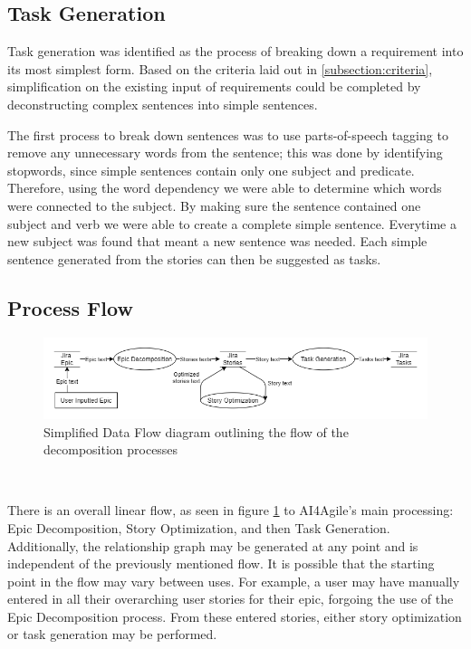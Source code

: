 \subsection{Task Generation}

Task generation was identified as the process of breaking down a requirement into its most simplest form. Based on the criteria laid out in \ref{subsection:criteria}, simplification on the existing input of requirements could be completed by deconstructing complex sentences into simple sentences. 

The first process to break down sentences was to use parts-of-speech tagging to remove any unnecessary words from the sentence; this was done by identifying stopwords, since simple sentences contain only one subject and predicate. Therefore, using the word dependency we were able to determine which words were connected to the subject. By making sure the sentence contained one subject and verb we were able to create a complete simple sentence. Everytime a new subject was found that meant a new sentence was needed. Each simple sentence generated from the stories can then be suggested as tasks.

\subsection{Process Flow}

\begin{figure}
\centerline{\includegraphics[width=\textwidth,height=\textheight,keepaspectratio]{./figure/ExampleDataFlowDiagram.png}}
\caption{Simplified Data Flow diagram outlining the flow of the decomposition processes}
\label{fig:ExampleDataFlowDiagram}
\end{figure}\

There is an overall linear flow, as seen in figure \ref{fig:ExampleDataFlowDiagram} to AI4Agile’s main processing: Epic Decomposition, Story Optimization, and then Task Generation. Additionally, the relationship graph may be generated at any point and is independent of the previously mentioned flow. It is possible that the starting point in the flow may vary between uses. For example, a user may have manually entered in all their overarching user stories for their epic, forgoing the use of the Epic Decomposition process. From these entered stories, either story optimization or task generation may be performed.

